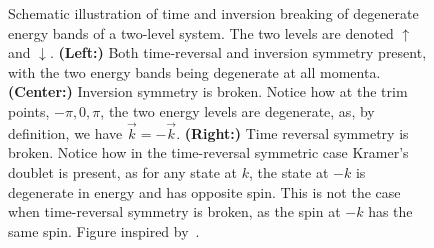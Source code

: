 \begin{figure}[h]
  \caption{Schematic illustration of time and inversion breaking of degenerate energy bands of a two-level system.
    The  two levels are denoted $\uparrow$ and $\downarrow$.
    \textbf{(Left:)} Both time-reversal and inversion symmetry present, with the two energy bands being degenerate at all momenta.
    \textbf{(Center:)} Inversion symmetry is broken. Notice how at the \gls{trim} points, $-\pi, 0, \pi$, the two energy levels are degenerate, as, by definition, we have $\vec{k} = -\vec{k}$.
    \textbf{(Right:)} Time reversal symmetry is broken.
    Notice how in the time-reversal symmetric case Kramer's doublet is present, as for any state at $k$, the state at $-k$ is degenerate  in energy and has opposite spin.
    This is not the case when time-reversal symmetry is broken, as the spin at  $-k$ has the same spin.
    Figure inspired by~\textcite{ramazashviliZeemanSpinorbitCoupling2019}.
  }
  \label{fig:symmetry_considerations}
\end{figure}

